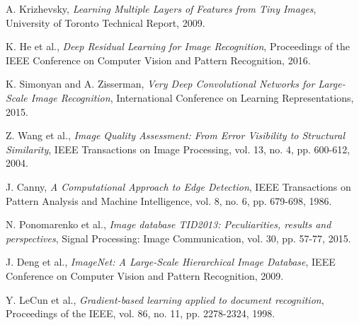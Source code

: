\documentclass[12pt]{article}
\begin{document}
\begin{thebibliography}{9}
A. Krizhevsky,
\textit{Learning Multiple Layers of Features from Tiny Images},
University of Toronto Technical Report, 2009.

K. He et al.,
\textit{Deep Residual Learning for Image Recognition},
Proceedings of the IEEE Conference on Computer Vision and Pattern Recognition, 2016.

K. Simonyan and A. Zisserman,
\textit{Very Deep Convolutional Networks for Large-Scale Image Recognition},
International Conference on Learning Representations, 2015.

Z. Wang et al.,
\textit{Image Quality Assessment: From Error Visibility to Structural Similarity},
IEEE Transactions on Image Processing, vol. 13, no. 4, pp. 600-612, 2004.

J. Canny,
\textit{A Computational Approach to Edge Detection},
IEEE Transactions on Pattern Analysis and Machine Intelligence, vol. 8, no. 6, pp. 679-698, 1986.

N. Ponomarenko et al.,
\textit{Image database TID2013: Peculiarities, results and perspectives},
Signal Processing: Image Communication, vol. 30, pp. 57-77, 2015.

J. Deng et al.,
\textit{ImageNet: A Large-Scale Hierarchical Image Database},
IEEE Conference on Computer Vision and Pattern Recognition, 2009.

Y. LeCun et al.,
\textit{Gradient-based learning applied to document recognition},
Proceedings of the IEEE, vol. 86, no. 11, pp. 2278-2324, 1998.
\end{thebibliography}
\end{document}
